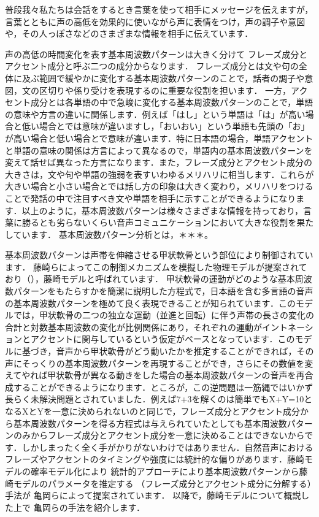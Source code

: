 普段我々私たちは会話をするとき言葉を使って相手にメッセージを伝えますが，言葉とともに声の高低を効果的に使いながら声に表情をつけ，声の調子や意図や，その人っぽさなどのさまざまな情報を相手に伝えています．

声の高低の時間変化を表す基本周波数パターンは大きく分けて
フレーズ成分とアクセント成分と呼ぶ二つの成分からなります．
フレーズ成分とは文や句の全体に及ぶ範囲で緩やかに変化する基本周波数パターンのことで，話者の調子や意図，文の区切りや係り受けを表現するのに重要な役割を担います．
一方，アクセント成分とは各単語の中で急峻に変化する基本周波数パターンのことで，単語の意味や方言の違いに関係します．例えば「はし」という単語は「は」が高い場合と低い場合とでは意味が違いますし，「おいおい」という単語も先頭の「お」が高い場合と低い場合とで意味が違います．特に日本語の場合，単語アクセントと単語の意味の関係は方言によって異なるので，単語内の基本周波数パターンを変えて話せば異なった方言になります．また，フレーズ成分とアクセント成分の大きさは，文や句や単語の強弱を表すいわゆるメリハリに相当します．これらが大きい場合と小さい場合とでは話し方の印象は大きく変わり，メリハリをつけることで発話の中で注目すべき文や単語を相手に示すことができるようになります．以上のように，基本周波数パターンは様々さまざまな情報を持っており，言葉に勝るとも劣らないくらい音声コミュニケーションにおいて大きな役割を果たしています．
基本周波数パターン分析とは，＊＊＊。

基本周波数パターンは声帯を伸縮させる甲状軟骨という部位により制御されています．
藤崎らによってこの制御メカニズムを模擬した物理モデルが提案されており（），藤崎モデルと呼ばれています．
甲状軟骨の運動がどのような基本周波数パターンをもたらすかを簡潔に説明した方程式で，日本語を含む多言語の音声の基本周波数パターンを極めて良く表現できることが知られています．このモデルでは，甲状軟骨の二つの独立な運動（並進と回転）に伴う声帯の長さの変化の合計と対数基本周波数の変化が比例関係にあり，それぞれの運動がイントネーションとアクセントに関与しているという仮定がベースとなっています．このモデルに基づき，音声から甲状軟骨がどう動いたかを推定することができれば，その声にそっくりの基本周波数パターンを再現することができ，さらにその数値を変えてやれば甲状軟骨が異なる動きをした場合の基本周波数パターンの音声を再合成することができるようになります．ところが，この逆問題は一筋縄ではいかず長らく未解決問題とされていました．例えば7+3を解くのは簡単でもX+Y=10となるXとYを一意に決められないのと同じで，フレーズ成分とアクセント成分から基本周波数パターンを得る方程式は与えられていたとしても基本周波数パターンのみからフレーズ成分とアクセント成分を一意に決めることはできないからです．しかしまったく全く手がかりがないわけではありません．自然音声におけるフレーズやアクセントのタイミングや強度には統計的な偏りがあります．藤崎モデルの確率モデル化により
統計的アプローチにより基本周波数パターンから藤崎モデルのパラメータを推定する
（フレーズ成分とアクセント成分に分解する）手法が
亀岡らによって提案されています．
以降で，藤崎モデルについて概説した上で
亀岡らの手法を紹介します．

